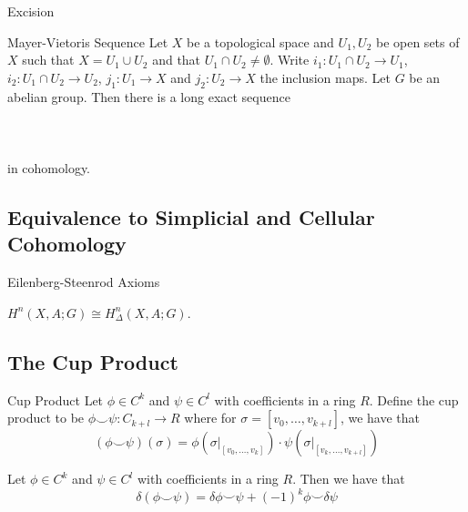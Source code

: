 \documentclass[a4paper]{article}
\begin{document}
\begin{thm}{Excision}{}
\end{thm}

\begin{thm}{Mayer-Vietoris Sequence}{} Let $X$ be a topological space and $U_1,U_2$ be open sets of $X$ such that $X=U_1\cup U_2$ and that $U_1\cap U_2\neq\emptyset$. Write $i_1:U_1\cap U_2\to U_1$, $i_2:U_1\cap U_2\to U_2$, $j_1:U_1\to X$ and $j_2:U_2\to X$ the inclusion maps. Let $G$ be an abelian group. Then there is a long exact sequence \\~\\
\\~\\
in cohomology. 
\end{thm}

\subsection{Equivalence to Simplicial and Cellular Cohomology}
\begin{defn}{Eilenberg-Steenrod Axioms}{}
\end{defn}

\begin{thm}{}{} $H^n(X,A;G)\cong H_\Delta^n(X,A;G)$. 
\end{thm}

\subsection{The Cup Product}
\begin{defn}{Cup Product}{} Let $\phi\in C^k$ and $\psi\in C^l$ with coefficients in a ring $R$. Define the cup product to be $\phi\smile\psi:C_{k+l}\to R$ where for $\sigma=[v_0,\dots,v_{k+l}]$, we have that $$(\phi\smile\psi)(\sigma)=\phi(\sigma|_{[v_0,\dots,v_k]})\cdot\psi(\sigma|_{[v_k,\dots,v_{k+l}]})$$
\end{defn}

\begin{prp}{}{} Let $\phi\in C^k$ and $\psi\in C^l$ with coefficients in a ring $R$. Then we have that $$\delta(\phi\smile\psi)=\delta\phi\smile\psi+(-1)^k\phi\smile\delta\psi$$
\end{prp}
\end{document}
